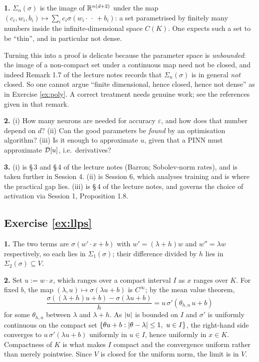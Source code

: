\documentclass[11pt,a4paper]{article}
\begin{document}
\textbf{1.} $\Sigma_n(\sigma)$ is the image of $\mathbb{R}^{n(d+2)}$ under the map
$(c_i,w_i,b_i)\mapsto\sum_i c_i\sigma(w_i\cdot{\,\cdot\,}+b_i)$: a set parametrised by finitely many
numbers inside the infinite-dimensional space $C(K)$. One expects such a set to be ``thin'', and in
particular not dense.

Turning this into a proof is delicate because the parameter space is \emph{unbounded}: the image of
a non-compact set under a continuous map need not be closed, and indeed Remark 1.7 of the lecture
notes records that $\Sigma_n(\sigma)$ is in general \emph{not} closed. So one cannot argue ``finite
dimensional, hence closed, hence not dense'' as in Exercise \ref{ex:poly}. A correct treatment needs
genuine work; see the references given in that remark.

\textbf{2.} (i) How many neurons are needed for accuracy $\varepsilon$, and how does that number
depend on $d$? (ii) Can the good parameters be \emph{found} by an optimisation algorithm? (iii) Is
it enough to approximate $u$, given that a PINN must approximate $\mathcal{D}[u]$, i.e.\ derivatives?

\textbf{3.} (i) is §\,3 and §\,4 of the lecture notes (Barron; Sobolev-norm rates), and is taken
further in Session 4. (ii) is Session 6, which analyses training and is where the practical gap
lies. (iii) is §\,4 of the lecture notes, and governs the choice of activation via Session 1,
Proposition 1.8.

\subsection*{Exercise \ref{ex:llps}}

\textbf{1.} The two terms are $\sigma(w'\cdot x + b)$ with $w' = (\lambda+h)w$ and $w'' = \lambda w$
respectively, so each lies in $\Sigma_1(\sigma)$; their difference divided by $h$ lies in
$\Sigma_2(\sigma)\subseteq V$.

\textbf{2.} Set $u := w\cdot x$, which ranges over a compact interval $I$ as $x$ ranges over $K$.
For fixed $b$, the map $(\lambda,u)\mapsto \sigma(\lambda u + b)$ is $C^\infty$; by the mean value
theorem,
\[
\frac{\sigma((\lambda+h)u+b)-\sigma(\lambda u+b)}{h} = u\,\sigma'(\theta_{h,u}\,u + b)
\]
for some $\theta_{h,u}$ between $\lambda$ and $\lambda+h$. As $\left\lvert u \right\rvert$ is bounded on $I$ and
$\sigma'$ is uniformly continuous on the compact set $\{\theta u + b : \left\lvert \theta-\lambda \right\rvert\le1,\ u \in I\}$,
the right-hand side converges to $u\,\sigma'(\lambda u + b)$ uniformly in $u \in I$, hence uniformly
in $x \in K$. Compactness of $K$ is what makes $I$ compact and the convergence uniform rather than
merely pointwise. Since $V$ is closed for the uniform norm, the limit is in $V$.
\end{document}

